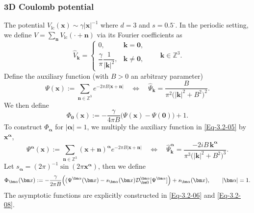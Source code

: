 \documentclass{sn-jnl}%
\newcommand{\m}{\textbf{-}}
\numberwithin{equation}{section}
\theoremstyle{thmstyleone}%
\theoremstyle{thmstyletwo}%
\theoremstyle{thmstylethree}%
\begin{document}
\subsubsection*{3D Coulomb potential} The potential $V_{\mathrm{lc}}(\bm x) \sim \gamma|\bm x|^{-1}$ where $d=3$ and $s=0.5^{\m}$. In the periodic setting, we define $V=\sum_{\bm n}V_{\mathrm{lc}}(\bm \cdot+\bm n)$ via its Fourier coefficients as 
\begin{equation}
\hat V_{\bm k}=
\begin{cases}
0, & \bm k=\bm 0,\\
\dfrac{\gamma}{\pi}\dfrac{1}{|\bm k|^{2}}, & \bm k\neq \bm 0 ,
\end{cases}
\qquad \bm k \in \mathbb{Z}^3.
\end{equation}
Define the auxiliary function (with $B>0$ an arbitrary parameter)
\begin{equation}\label{Eq-3.2-05}
    \Psi(\bm x)
    := \sum_{\bm n\in \mathbb{Z}^3} e^{-2\pi B|\bm x + \bm n|}
    \quad \Longleftrightarrow \quad
    \hat{\Psi}_{\bm k}
    = \frac{B}{\pi^2\bigl(|\bm k|^2+B^2\bigr)^2}.
\end{equation}
We then define
\begin{equation}\label{Eq-3.2-06}
    \Phi_{\bm 0}(\bm x)
    := -\frac{\gamma}{4\pi B}\bigl(\Psi(\bm x)-\Psi(\bm 0)\bigr) + 1 .
\end{equation}
To construct $\Phi_{\bm \alpha}$ for $|\bm \alpha|=1$, we multiply the auxiliary
function in \eqref{Eq-3.2-05} by $\bm x^{\bm \alpha}$,
\begin{equation}
    \Psi^{\bm \alpha}(\bm x)
    := \sum_{\bm n\in \mathbb{Z}^3}
    (\bm x+\bm n)^{\bm \alpha} e^{-2\pi B|\bm x+\bm n|}
    \quad \Longleftrightarrow \quad
    \hat{\Psi}^{\bm \alpha}_{\bm k}
    = \frac{-2 i B\, \bm k^{\bm \alpha}}
    {\pi^3\bigl(|\bm k|^2+B^2\bigr)^3}.
\end{equation}
Let $s_{\bm \alpha} = {(2\pi)}^{-1}\sin (2\pi \bm x^{\bm \alpha})$, then we define
\begin{equation}\label{Eq-3.2-08}
    \Phi_{\bm \alpha}(\bm x)
    := -\frac{\gamma}{2\pi B}
    \Bigl(
        (\Psi^{\bm \alpha}(\bm x)
        - s_{\bm \alpha}(\bm x)\mathcal{D}^{\bm \alpha}_{\bm 0}[ \Psi^{\bm \alpha}] 
    \Bigr)
    +s_{\bm \alpha}(\bm x),
    \qquad |\bm \alpha|=1.
\end{equation}
The asymptotic functions are explicitly constructed in \eqref{Eq-3.2-06} and \eqref{Eq-3.2-08}. 
\end{document}
